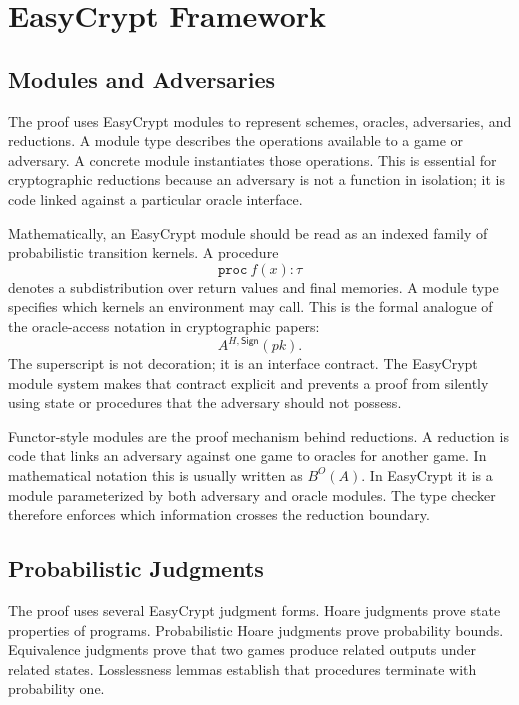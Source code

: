 \chapter{EasyCrypt Framework}
\label{ch:framework}

\section{Modules and Adversaries}

The proof uses EasyCrypt modules to represent schemes, oracles, adversaries,
and reductions.  A module type describes the operations available to a game or
adversary.  A concrete module instantiates those operations.  This is essential
for cryptographic reductions because an adversary is not a function in
isolation; it is code linked against a particular oracle interface.

Mathematically, an EasyCrypt module should be read as an indexed family of
probabilistic transition kernels.  A procedure
\[
  \mathtt{proc}\ f(x):\tau
\]
denotes a subdistribution over return values and final memories.  A module type
specifies which kernels an environment may call.  This is the formal analogue of
the oracle-access notation in cryptographic papers:
\[
  A^{H,\mathsf{Sign}}(pk).
\]
The superscript is not decoration; it is an interface contract.  The EasyCrypt
module system makes that contract explicit and prevents a proof from silently
using state or procedures that the adversary should not possess.

Functor-style modules are the proof mechanism behind reductions.  A reduction is
code that links an adversary against one game to oracles for another game.  In
mathematical notation this is usually written as \(B^O(A)\).  In EasyCrypt it is
a module parameterized by both adversary and oracle modules.  The type checker
therefore enforces which information crosses the reduction boundary.

\section{Probabilistic Judgments}

The proof uses several EasyCrypt judgment forms.  Hoare judgments prove state
properties of programs.  Probabilistic Hoare judgments prove probability bounds.
Equivalence judgments prove that two games produce related outputs under
related states.  Losslessness lemmas establish that procedures terminate with
probability one.

